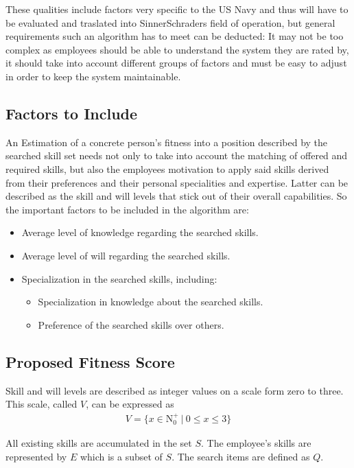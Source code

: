These qualities include factors very specific to the US Navy and thus will have to be evaluated and traslated into SinnerSchraders field of operation, but general requirements such an algorithm has to meet can be deducted: It may not be too complex as employees should be able to understand the system they are rated by, it should take into account different groups of factors and must be easy to adjust in order to keep the system maintainable.

\subsection{Factors to Include}
An Estimation of a concrete person's fitness into a position described by the searched skill set needs not only to take into account the matching of offered and required skills, but also the employees motivation to apply said skills derived from their preferences and their personal specialities and expertise. Latter can be
described as the skill and will levels that stick out of their overall capabilities. So the important factors to be included in the algorithm are:
\begin{itemize}
  \item Average level of knowledge regarding the searched skills.
  \item Average level of will regarding the searched skills.
  \item Specialization in the searched skills, including:
  \begin{itemize}
    \item Specialization in knowledge about the searched skills.
    \item Preference of the searched skills over others.
  \end{itemize}
\end{itemize}


\subsection{Proposed Fitness Score}
Skill and will levels are described as integer values on a scale form zero to three. This scale, called $V$, can be expressed as
\begin{gather*}
  V = \{ x \in \mathrm{N}_0^+ \ | \  0 \leq x \leq 3\}
\end{gather*}

All existing skills are accumulated in the set $S$. The employee's skills are represented by $E$ which is a subset of $S$. The search items are
defined as $Q$.

